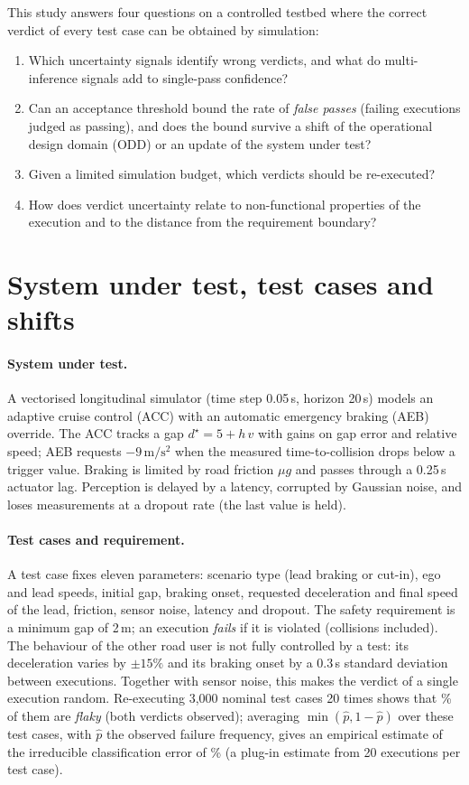 \documentclass[10pt,a4paper]{article}
\begin{document}
This study answers four questions on a controlled testbed where the correct verdict of every test case can be obtained by simulation:
\begin{enumerate}
  \item[\textbf{Q1}] Which uncertainty signals identify wrong verdicts, and what do multi-inference signals add to single-pass confidence?
  \item[\textbf{Q2}] Can an acceptance threshold bound the rate of \emph{false passes} (failing executions judged as passing), and does the bound survive a shift of the operational design domain (ODD) or an update of the system under test?
  \item[\textbf{Q3}] Given a limited simulation budget, which verdicts should be re-executed?
  \item[\textbf{Q4}] How does verdict uncertainty relate to non-functional properties of the execution and to the distance from the requirement boundary?
\end{enumerate}

\section{System under test, test cases and shifts}
\paragraph{System under test.} A vectorised longitudinal simulator (time step 0.05\,s, horizon 20\,s) models an adaptive cruise control (ACC) with an automatic emergency braking (AEB) override. The ACC tracks a gap $d^\star=5+h\,v$ with gains on gap error and relative speed; AEB requests $-9\,\mathrm{m/s^2}$ when the measured time-to-collision drops below a trigger value. Braking is limited by road friction $\mu g$ and passes through a 0.25\,s actuator lag. Perception is delayed by a latency, corrupted by Gaussian noise, and loses measurements at a dropout rate (the last value is held).

\paragraph{Test cases and requirement.} A test case fixes eleven parameters: scenario type (lead braking or cut-in), ego and lead speeds, initial gap, braking onset, requested deceleration and final speed of the lead, friction, sensor noise, latency and dropout. The safety requirement is a minimum gap of 2\,m; an execution \emph{fails} if it is violated (collisions included). The behaviour of the other road user is not fully controlled by a test: its deceleration varies by $\pm15\%$ and its braking onset by a 0.3\,s standard deviation between executions. Together with sensor noise, this makes the verdict of a single execution random. Re-executing 3,000 nominal test cases 20 times shows that \numFlaky\% of them are \emph{flaky} (both verdicts observed); averaging $\min(\hat p,1-\hat p)$ over these test cases, with $\hat p$ the observed failure frequency, gives an empirical estimate of the irreducible classification error of \numBayesErr\% (a plug-in estimate from 20 executions per test case).
\end{document}
